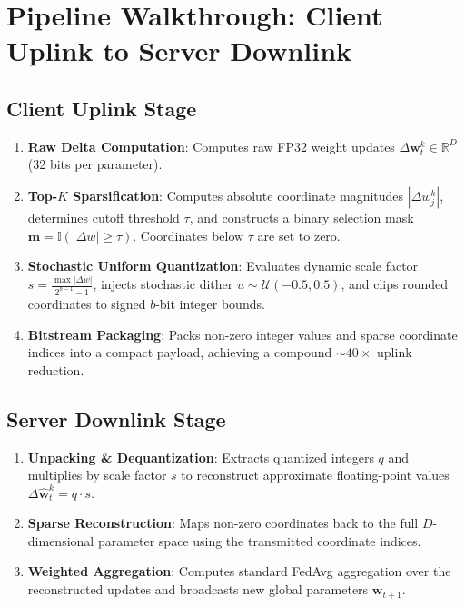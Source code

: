 \documentclass[11pt,a4paper,titlepage]{report}
\begin{document}
\section{Pipeline Walkthrough: Client Uplink to Server Downlink}
\subsection{Client Uplink Stage}
\begin{enumerate}[leftmargin=*]
    \item \textbf{Raw Delta Computation}: Computes raw FP32 weight updates $\Delta\mathbf{w}_t^k \in \mathbb{R}^D$ (32 bits per parameter).
    \item \textbf{Top-$K$ Sparsification}: Computes absolute coordinate magnitudes $|\Delta w_j^k|$, determines cutoff threshold $\tau$, and constructs a binary selection mask $\mathbf{m} = \mathbb{I}(|\Delta w| \ge \tau)$. Coordinates below $\tau$ are set to zero.
    \item \textbf{Stochastic Uniform Quantization}: Evaluates dynamic scale factor $s = \frac{\max |\Delta w|}{2^{b-1} - 1}$, injects stochastic dither $u \sim \mathcal{U}(-0.5, 0.5)$, and clips rounded coordinates to signed $b$-bit integer bounds.
    \item \textbf{Bitstream Packaging}: Packs non-zero integer values and sparse coordinate indices into a compact payload, achieving a compound $\sim 40\times$ uplink reduction.
\end{enumerate}

\subsection{Server Downlink Stage}
\begin{enumerate}[leftmargin=*]
    \item \textbf{Unpacking \& Dequantization}: Extracts quantized integers $q$ and multiplies by scale factor $s$ to reconstruct approximate floating-point values $\Delta\hat{\mathbf{w}}_t^k = q \cdot s$.
    \item \textbf{Sparse Reconstruction}: Maps non-zero coordinates back to the full $D$-dimensional parameter space using the transmitted coordinate indices.
    \item \textbf{Weighted Aggregation}: Computes standard FedAvg aggregation over the reconstructed updates and broadcasts new global parameters $\mathbf{w}_{t+1}$.
\end{enumerate}
\end{document}
